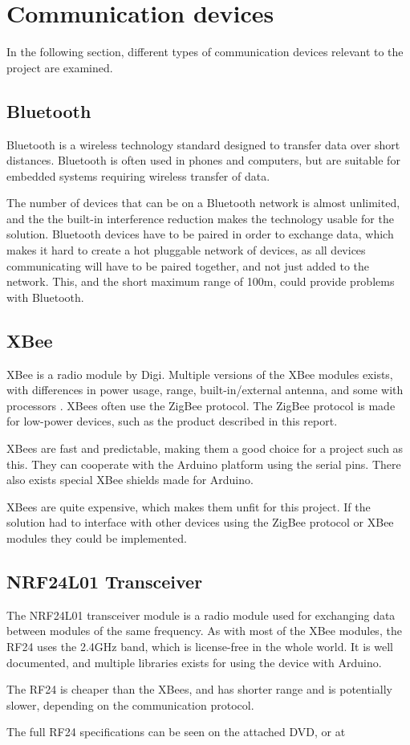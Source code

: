 \section{Communication devices}
In the following section, different types of communication devices relevant to the project are examined.

\subsection{Bluetooth}
Bluetooth is a wireless technology standard designed to transfer data over short distances\cite{bluetoothbasics}. Bluetooth is often used in phones and computers, but are suitable for embedded systems requiring wireless transfer of data.

The number of devices that can be on a Bluetooth network is almost unlimited, and the the built-in interference reduction makes the technology usable for the solution\cite{bluetoothbasics}.
Bluetooth devices have to be paired in order to exchange data, which makes it hard to create a hot pluggable network of devices, as all devices communicating will have to be paired together, and not just added to the network. 
This, and the short maximum range of 100m\cite{bluetoothbasics}, could provide problems with Bluetooth.

\subsection{XBee}
XBee is a radio module by Digi. Multiple versions of the XBee modules exists, with differences in power usage, range, built-in/external antenna, and some with processors \cite{sparkfunXbeeGuide}.
XBees often use the ZigBee protocol. The ZigBee protocol is made for low-power devices, such as the product described in this report\cite{zigbee}.

XBees are fast and predictable, making them a good choice for a project such as this. They can cooperate with the Arduino platform using the serial pins. There also exists special XBee shields made for Arduino.

XBees are quite expensive, which makes them unfit for this project. If the solution had to interface with other devices using the ZigBee protocol or XBee modules they could be implemented.

\subsection{NRF24L01 Transceiver}
The NRF24L01 transceiver module is a radio module used for exchanging data between modules of the same frequency. As with most of the XBee modules, the RF24 uses the 2.4GHz band, which is license-free in the whole world\cite{itubands}. It is well documented, and multiple libraries exists for using the device with Arduino.

The RF24 is cheaper than the XBees, and has shorter range and is potentially slower, depending on the communication protocol.

The full RF24 specifications can be seen on the attached DVD, or at \cite{nf24datasheet}

